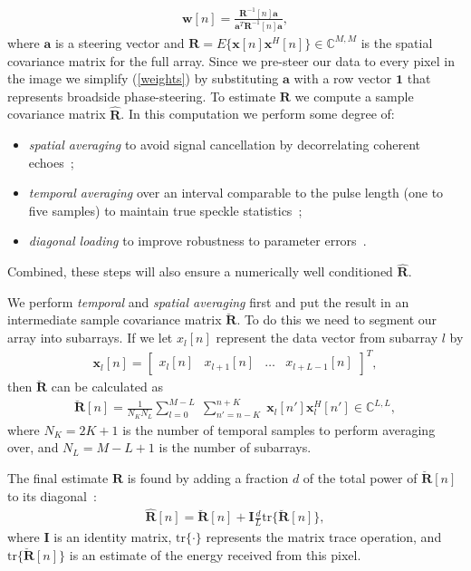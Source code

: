 \documentclass[10pt,journal,draftclsnofoot,onecolumn]{IEEEtran}
\newcommand\bmat[1]{\begin{bmatrix}#1\end{bmatrix}}
\newcommand\tr{\text{tr}}
\newcommand\sumb[2]{\sum\limits_{#1}^{#2}\;}
\newcommand\T{^{\scriptscriptstyle T}}
\renewcommand\H{^{\scriptscriptstyle H}}
\renewcommand\vec[1]{\boldsymbol{#1}}
\newcommand\mat[1]{\boldsymbol{#1}}
\newcommand\1{\vec 1}
\newcommand\I{\mat I}
\renewcommand*\a{\vec a}
\newcommand*\x{\vec x}
\newcommand*\R{\mat R}
\newcommand*\Ri{\R^{-1}}
\newcommand*\eR{\mat{\hat R}}
\begin{document}
\begin{gather}
\vec w[n] = \frac{\Ri[n]\a}{\a\T\Ri[n]\a},\label{weights}
\end{gather}
where $\a$ is a steering vector and $\R=E\{\x[n]\x\H[n]\}\in\mathbb{C}^{M,M}$ is the spatial covariance matrix for the full array. Since we pre-steer our data to every pixel in the image we simplify (\ref{weights}) by substituting $\a$ with a row vector $\1$ that represents broadside phase-steering. To estimate $\R$ we compute a sample covariance matrix $\eR$. In this computation we perform some degree of:
\begin{itemize}
\item \emph{spatial averaging} to avoid signal cancellation by decorrelating coherent echoes~\cite{Kailath1985};
\item \emph{temporal averaging} over an interval comparable to the pulse length (one to five samples) to maintain true speckle statistics~\cite{Synnevag2009a};
\item \emph{diagonal loading} to improve robustness to parameter errors~\cite{Cox1987,Maksym1979}.
\end{itemize}%
%
%
Combined, these steps will also ensure a numerically well conditioned $\eR$.

We perform \emph{temporal} and \emph{spatial averaging} first and put the result in an intermediate sample covariance matrix $\breve{\R}$. To do this we need to segment our array into subarrays. If we let $x_l[n]$ represent the data vector from subarray $l$ by
\begin{gather}
\x_l[n] = \bmat{x_l[n] & x_{l+1}[n] & \dots & x_{l+L-1}[n]}\T,
\end{gather}
then $\breve{\R}$ can be calculated as
\begin{gather}
\breve{\R}[n] =  \frac{1}{N_K N_L} \sumb{l=0}{M-L}\sumb{n'=n-K}{n+K} \x_l[n']\x_l\H[n'] \in\mathbb{C}^{L,L},\label{spatialR}
\end{gather}
where $N_K = 2K+1$ is the number of temporal samples to perform averaging over, and $N_L = M-L+1$ is the number of subarrays.

The final estimate $\eR$ is found by adding a fraction $d$ of the total power of $\breve{\R}[n]$ to its diagonal~\cite{Synnevag2007}:
\begin{align}
\eR[n] = \breve{\R}[n] + \I \frac{d}{L} \tr\{\breve{\R}[n]\},\label{finalR}
\end{align}
where $\I$ is an identity matrix, $\tr\{\cdot\}$ represents the matrix trace operation, and $\tr\{\breve{\R}[n]\}$ is an estimate of the energy received from this pixel.
\end{document}
